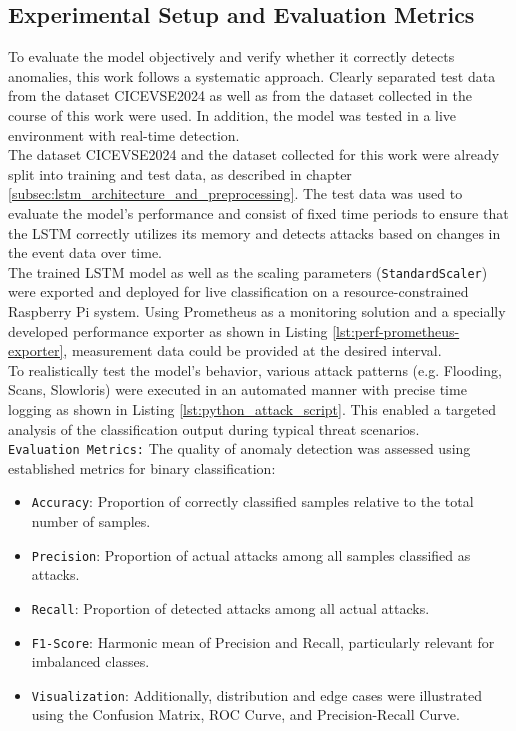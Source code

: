 \subsection{Experimental Setup and Evaluation Metrics}

To evaluate the model objectively and verify whether it correctly detects anomalies, this work follows a systematic approach. Clearly separated test data from the dataset CICEVSE2024 as well as from the dataset collected in the course of this work were used. In addition, the model was tested in a live environment with real-time detection.\\

The dataset CICEVSE2024 and the dataset collected for this work were already split into training and test data, as described in chapter \ref{subsec:lstm_architecture_and_preprocessing}. The test data was used to evaluate the model’s performance and consist of fixed time periods to ensure that the LSTM correctly utilizes its memory and detects attacks based on changes in the event data over time.\\

The trained LSTM model as well as the scaling parameters (\texttt{StandardScaler}) were exported and deployed for live classification on a resource-constrained Raspberry Pi system. Using Prometheus as a monitoring solution and a specially developed performance exporter as shown in Listing \ref{lst:perf-prometheus-exporter}, measurement data could be provided at the desired interval.\\

To realistically test the model’s behavior, various attack patterns (e.g. Flooding, Scans, Slowloris) were executed in an automated manner with precise time logging as shown in Listing \ref{lst:python_attack_script}. This enabled a targeted analysis of the classification output during typical threat scenarios.\\

\texttt{Evaluation Metrics:} The quality of anomaly detection was assessed using established metrics for binary classification:
\begin{itemize}
    \item \texttt{Accuracy}: Proportion of correctly classified samples relative to the total number of samples.
    \item \texttt{Precision}: Proportion of actual attacks among all samples classified as attacks.
    \item \texttt{Recall}: Proportion of detected attacks among all actual attacks.
    \item \texttt{F1-Score}: Harmonic mean of Precision and Recall, particularly relevant for imbalanced classes.
    \item \texttt{Visualization}: Additionally, distribution and edge cases were illustrated using the Confusion Matrix, ROC Curve, and Precision-Recall Curve.
\end{itemize}

